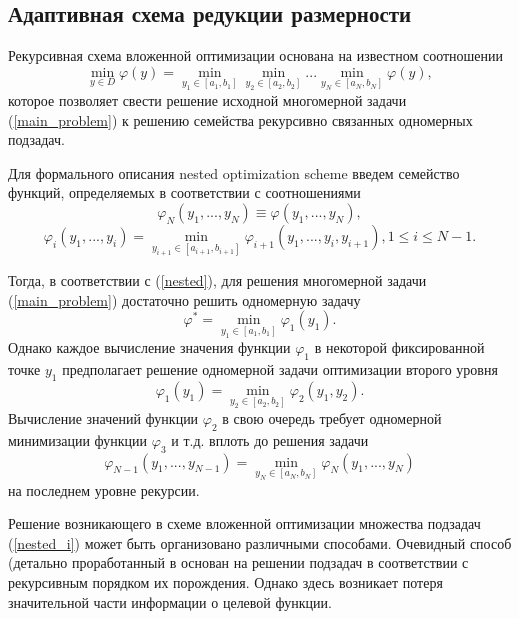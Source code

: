 \documentclass[entropy,article,submit,moreauthors,pdftex]{Definitions/mdpi}
\begin{document}
\subsection{Адаптивная схема редукции размерности }

Рекурсивная схема вложенной оптимизации основана на известном соотношении \cite{Grishagin2001} 
\begin{equation}\label{nested}
\min_{y \in D}\varphi(y) = \min_{y_1\in\left[a_1,b_1\right]}\min_{y_2\in\left[a_2,b_2\right]}...\min_{y_N\in\left[a_N,b_N\right]}\varphi(y),
\end{equation}
которое позволяет свести решение исходной многомерной задачи (\ref{main_problem}) к решению семейства рекурсивно связанных одномерных подзадач.

Для формального описания nested optimization scheme введем семейство функций, определяемых в соответствии с соотношениями 
\begin{equation}\label{nested_N}
\varphi_N(y_1,...,y_N) \equiv \varphi(y_1,...,y_N),
\end{equation}
\begin{equation}\label{nested_i}
\varphi_i(y_1,...,y_i) = \min_{ y_{i+1} \in\left[a_{i+1},b_{i+1}\right]} \varphi_{i+1}(y_1,...,y_i,y_{i+1}), 1\leq i\leq N-1.
\end{equation}

Тогда, в соответствии с (\ref{nested}), для решения многомерной задачи (\ref{main_problem}) достаточно решить одномерную задачу  
\begin{equation}\label{nested_1}
\varphi^* = \min_{y_1\in\left[a_1,b_1\right]}\varphi_1(y_1).
\end{equation}
Однако каждое вычисление значения функции $\varphi_1$ в некоторой фиксированной точке $y_1$ предполагает решение одномерной задачи оптимизации второго уровня 
\begin{equation}
\varphi_1(y_1) = \min_{y_2\in\left[a_2,b_2\right]}\varphi_2(y_1,y_2).
\end{equation}
Вычисление значений функции $\varphi_2$ в свою очередь требует одномерной минимизации функции $\varphi_3$ и т.д. вплоть до решения задачи
\begin{equation}
\varphi_{N-1}(y_1,...,y_{N-1}) = \min_{ y_{N} \in\left[a_{N},b_{N}\right]} \varphi_{N}(y_1,...,y_{N})
\end{equation}
на последнем уровне рекурсии.

Решение возникающего в схеме вложенной оптимизации множества подзадач (\ref{nested_i}) может быть организовано различными способами. 
Очевидный способ (детально проработанный в \cite{Grishagin2001,Grishagin2015} основан на решении подзадач в соответствии с рекурсивным порядком их порождения. Однако здесь возникает потеря значительной части информации о целевой функции. 
\end{document}
